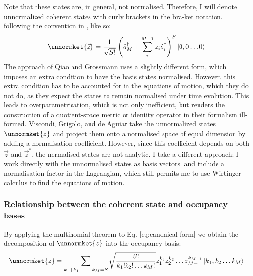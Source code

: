 \documentclass[12pt]{article}
\begin{document}
	Note that these states are, in general, not normalised. Therefore, I will denote unnormalized coherent states with curly brackets in the bra-ket notation, following the convention in \cite{Aguiar}, like so:
	\begin{equation} \label{eq:canonical form}
	\unnormket{\vec{z}}=\frac{1}{\sqrt{S!}}\left(\hat{a}^\dagger_M+\sum_i^{M-1}z_i\hat{a}^\dagger_i\right)^S\ket{0,0\dots 0}
	\end{equation}
	The approach of Qiao and Grossmann uses a slightly different form, which imposes an extra condition to have the basis states normalised. However, this extra condition has to be accounted for in the equations of motion, which they do not do, as they expect the states to remain normalised under time evolution. This leads to overparametrisation, which is not only inefficient, but renders the construction of a quotient-space metric or identity operator in their formalism ill-formed. Viscondi, Grigolo, and de Aguiar take the unnormalized states $\unnormket{z}$ and project them onto a normalised space of equal dimension by adding a normalisation coefficient. However, since this coefficient depends on both $\vec{z}$ and $\vec{z}^*$, the normalised states are not analytic. I take a different approach: I work directly with the unnormalised states as basis vectors, and include a normalisation factor in the Lagrangian, which still permits me to use Wirtinger calculus to find the equations of motion.
	\subsubsection{Relationship between the coherent state and occupancy bases}
	By applying the multinomial theorem to Eq. \ref{eq:canonical form} we obtain the decomposition of $\unnormket{z}$ into the occupancy basis:
	\begin{equation}
	\unnormket{z}=\sum_{k_1+k_1+\dots +k_M=S}\sqrt{\frac{S!}{k_1!k_2!\dots k_M!}}z_1^{k_1}z_2^{k_2}\dots z_{M-1}^{k_{M-1}}\ket{k_1,k_2\dots k_M}
	\end{equation}
	
\end{document}

